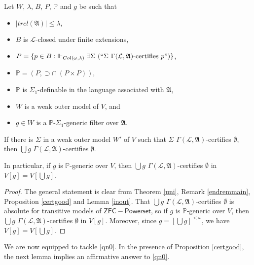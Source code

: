\documentclass[12pt]{article}
\numberwithin{equation}{section}
\begin{document}
\begin{lem}\label{main2}
Let $W$, $\lambda$, $B$, $P$, $\mathbb{P}$ and $g$ be such that
\begin{itemize}
    \item $|trcl(\mathfrak{A})| \leq \lambda$,
    \item $B$ is $\mathcal{L}$-closed under finite extensions,
    \item $P = \{p \in B : \ \Vdash_{Col(\omega, \lambda)} \exists \Sigma \ (``\Sigma \ \Gamma(\mathcal{L}, \mathfrak{A}) \text{-certifies } p")\}$,
    \item $\mathbb{P} = (P, \supset \cap \ (P \times P))$, 
    \item $\mathbb{P}$ is $\Sigma_1$-definable in the language associated with $\mathfrak{A}$,
    \item $W$ is a weak outer model of $V$, and
    \item $g \in W$ is a $\mathbb{P}$-$\Sigma_1$-generic filter over $\mathfrak{A}$.
\end{itemize}
If there is $\Sigma$ in a weak outer model $W'$ of $V$ such that $\Sigma$ $\Gamma(\mathcal{L}, \mathfrak{A})$-certifies $\emptyset$, then $\bigcup g$ $\Gamma(\mathcal{L}, \mathfrak{A})$-certifies $\emptyset$.

In particular, if $g$ is $\mathbb{P}$-generic over $V$, then $\bigcup g$ $\Gamma(\mathcal{L}, \mathfrak{A})$-certifies $\emptyset$ in $V[g] = V[\bigcup g]$.
\end{lem}

\begin{proof}
The general statement is clear from Theorem \ref{uni}, Remark \ref{endremmain}, Proposition \ref{certgood} and Lemma \ref{inout}. That $\bigcup g$ $\Gamma(\mathcal{L}, \mathfrak{A})$-certifies $\emptyset$ is absolute for transitive models of $\mathsf{ZFC - Powerset}$, so if $g$ is $\mathbb{P}$-generic over $V$, then  $\bigcup g$ $\Gamma(\mathcal{L}, \mathfrak{A})$-certifies $\emptyset$ in $V[g]$. Moreover, since $g = [\bigcup g]^{< \omega}$, we have $V[g] = V[\bigcup g]$.
\end{proof}

We are now equipped to tackle \ref{qn0}. In the presence of Proposition \ref{certgood}, the next lemma implies an affirmative answer to \ref{qn0}.
\end{document}
